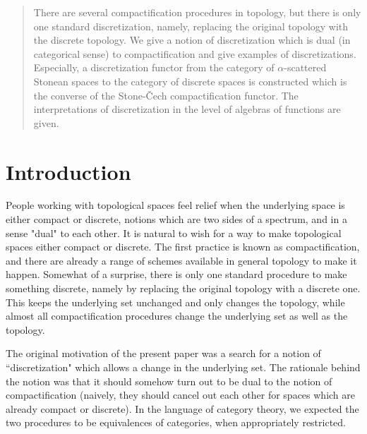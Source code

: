\documentclass[manuscript]{amsart}
\author[M. Amini and N. Golestani]{Massoud Amini and Nasser Golestani}
\theoremstyle{definition}
\begin{document}
\begin{abstract}
 There are several compactification procedures in topology,
but there is only one standard discretization, namely,
replacing the original topology with the discrete topology.
We give a notion of discretization which is dual (in categorical sense) to compactification
and give examples of discretizations.
Especially, a discretization functor from the category of $\alpha$-scattered  Stonean spaces
to the category of discrete spaces is constructed which is the converse of the
Stone-\v{C}ech compactification functor.
The interpretations of discretization in the level of algebras of functions are given.
\end{abstract}

\maketitle
\tableofcontents

\section{Introduction}

\noindent

People working with topological spaces feel relief when the underlying space is either compact or discrete, notions which are two sides of a spectrum, and in a sense "dual" to each other. It is natural to wish for a way to make topological spaces either compact or discrete. The first practice is known as compactification, and there are already a range of schemes available in general topology to make it happen. Somewhat of a surprise, there is only one standard procedure to make something discrete, namely by replacing the original topology with a discrete one. This keeps the underlying set unchanged and only changes the topology, while almost all compactification procedures change the underlying set as well as the topology.

The original motivation of the present paper was a search for a notion of ``discretization" which allows a change in the underlying set. The rationale behind the notion was that it should somehow turn out to be dual to the notion of compactification (naively, they should cancel out each other for spaces which are already compact or discrete). In the language of category theory, we expected the two procedures to be equivalences of categories, when appropriately restricted.
\end{document}
